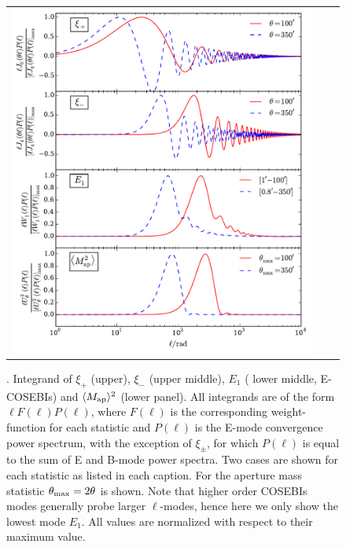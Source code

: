 \begin{figure}[!htp]
\begin{center}
\begin{tabular}{ccc}
\includegraphics[width=\textwidth]{figures/IntegAll.pdf} \\
\end{tabular}
\caption{ \small{\label{fig:filters}. Integrand of $\xi_+$ (upper), $\xi_-$ (upper middle), $E_1$ ( lower middle, E-COSEBIs) and $\langle M_{\rm ap} \rangle^2$ (lower panel).
All integrands are of the form $\ell F(\ell) P(\ell)$, where $F(\ell)$ is the corresponding weight-function
for each statistic and $P(\ell)$ is the E-mode convergence power spectrum, with the exception of $\xi_\pm$, for which
$P(\ell)$ is equal to the sum of E and B-mode power spectra. 
Two cases are shown for each statistic as listed in each caption.
For the aperture mass statistic $\theta_{\rm max}=2\theta$ is shown. 
Note that higher order COSEBIs modes generally probe larger $\ell$-modes, 
hence here we only show the lowest mode $E_1$. All values are normalized with respect to their maximum value. }
}
\end{center}
\end{figure}

